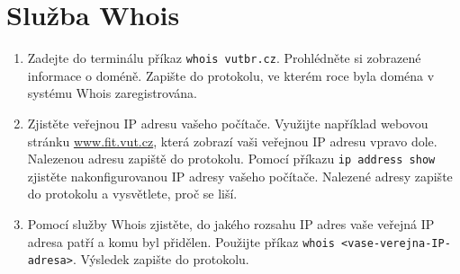 \documentclass[a4paper,11pt]{article}
\begin{document}
\section{Služba Whois}
\begin{enumerate}
    \item Zadejte do terminálu příkaz \texttt{whois vutbr.cz}. Prohlédněte si zobrazené informace o doméně. Zapište do protokolu, ve kterém roce byla doména v systému Whois zaregistrována.
    \item Zjistěte veřejnou IP adresu vašeho počítače. Využijte například  webovou stránku \url{www.fit.vut.cz}, která zobrazí vaši veřejnou IP adresu vpravo dole. Nalezenou adresu zapiště do protokolu. Pomocí příkazu \texttt{ip address show} zjistěte nakonfigurovanou IP adresy vašeho počítače. Nalezené adresy zapište do protokolu a vysvětlete, proč se liší. 
    \item Pomocí služby Whois zjistěte, do jakého rozsahu IP adres vaše veřejná IP adresa patří a komu byl přidělen. Použijte příkaz \texttt{whois <vase-verejna-IP-adresa>}. Výsledek zapište do protokolu.
\end{enumerate}

\end{document}
